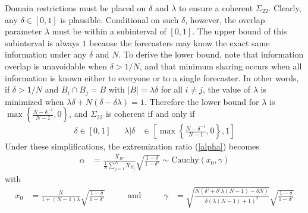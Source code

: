 \documentclass[11pt]{article}
\theoremstyle{definition}
\theoremstyle{definition}
\begin{document}
Domain restrictions must be placed on $\delta$ and $\lambda$ to ensure a coherent $\Sigma_{22}$. Clearly, any $\delta \in [0,1]$ is plausible. Conditional on such $\delta$, however, the overlap parameter $\lambda$ must be within a subinterval of $[0,1]$. The upper bound of this subinterval is always $1$ because the 
forecasters may know the exact same information under any $\delta$ and $N$. To derive the lower bound, note that  
information overlap is unavoidable when $\delta > 1/N$, and that minimum
sharing occurs when all information is known either to everyone or
to a single forecaster.  In other words, if $\delta > 1/N$ and
$B_{i} \cap B_j = B$ with $|B| = \lambda \delta$ for all $i \neq j$,
the value of $\lambda$ is minimized when $\lambda\delta + N(\delta -
\delta\lambda) = 1$.  Therefore the lower bound for $\lambda$ is $\max
\left\{ \frac{N-\delta^{-1}}{N-1}, 0\right\}$, and $\Sigma_{22}$ is
coherent if and only if
\begin{align}
\delta \in [0,1] &&  \lambda | \delta &\in \left[  
   \max \left\{ \frac{N-\delta^{-1}}{N-1}, 0\right\}, 1 \right] 
   \label{rhoDomain}
\end{align}
Under these simplifications, the extremization ratio (\ref{alpha})
becomes
\begin{align*}
\alpha &= \frac{X_{B'}}{\frac{1}{N}\sum_{j=1}^N X_{B_j}} \sqrt{\frac{1-\delta}{1-\delta'}} \sim \text{Cauchy}(x_0, \gamma)
\end{align*}
 with
\begin{align*}
x_0 &= \frac{N}{1+(N-1)\lambda}  \sqrt{\frac{1-\delta}{1-\delta'}} &&& \text{ and } &&& \gamma &=  \sqrt{\frac{N(\delta' + \delta' \lambda (N-1) - \delta N)}{\delta (\lambda (N-1) + 1)^2}}\sqrt{\frac{1-\delta}{1-\delta'}}
\end{align*}
\end{document}
